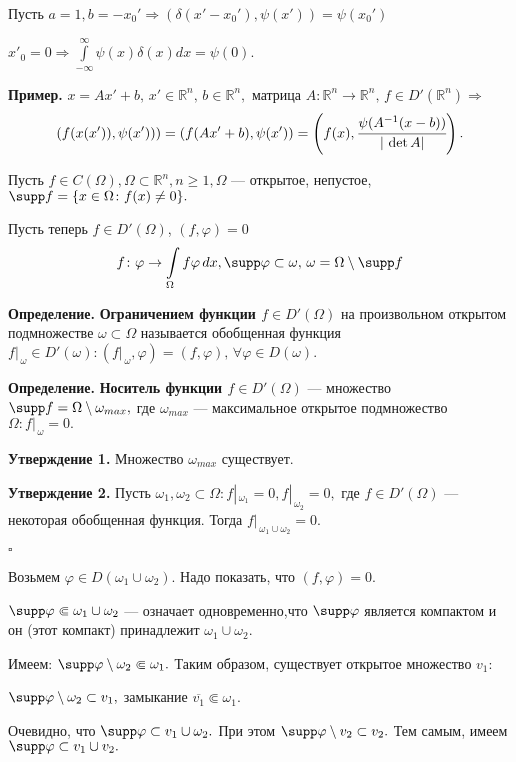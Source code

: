 \documentclass[12pt,a4paper,draft]{article}
\DeclareRobustCommand*{\т}{~--- }
\DeclareRobustCommand*{\ч}{~-- }
\begin{document}
Пусть $a=1, b=-x_0' \Rightarrow
(\delta(x'-x_0'),\psi(x'))=\psi(x_0')$

$x'_0=0 \Rightarrow
\int\limits_{-\infty}^{\infty}\psi(x)\delta(x)dx=\psi(0).$

\textbf{Пример.} $x=Ax'+b,\,x'\in \mathbb R^n, \,b\in\mathbb R^n,
$ матрица $A\colon \mathbb R^n\to\mathbb R^n, \,f\in D'(\mathbb
R^n) \Rightarrow $
$$(f(x(x')),\psi(x')))=(f(Ax'+b),\psi(x'))=\left(f(x),\cfrac{\psi(A^{-1}(x-b))}{|\,\det
A|}\right).$$


Пусть $f\in C(\Omega), \Omega\subset \mathbb R^n, n\ge1, \Omega$
--- открытое, непустое, $\supp f=\{x\in \Omega\colon f(x)\ne0\}.$

Пусть теперь $f\in D'(\Omega)$, $(f,\varphi)=0$
$$f\colon \varphi\to\int\limits_{\Omega}f\varphi\,dx, \supp \varphi\subset \omega,\, \omega=\Omega \setminus \supp f$$

\textbf{Определение.} \textbf{Ограничением функции $f\in D'
(\Omega)$} на произвольном открытом подмножестве
$\omega\subset\Omega$ называется обобщенная функция
$f|_{\,\omega}\in D' (\omega)\colon
(f|_{\,\omega},\varphi)=(f,\varphi), \,\forall \varphi \in D
(\omega).$

\textbf{Определение.} \textbf{Носитель функции $f\in D' (\Omega)$}
--- множество $\supp f=\Omega \setminus \omega_{max},$ где
$\omega_{max}$ --- максимальное открытое подмножество
$\Omega\colon f|_{\,\omega}=0.$

\textbf{Утверждение 1.} Множество $\omega_{max}$ существует.

\textbf{Утверждение 2.} Пусть $\omega_1, \omega_2\subset
\Omega\colon f|_{\,\omega_1}=0, f|_{\,\omega_2}=0,$ где $f\in
D'(\Omega)$ --- некоторая обобщенная функция. Тогда
$f|_{\,\omega_1\cup\omega_2}=0.$

$\square$

Возьмем $\varphi\in D(\omega_1\cup\omega_2).$ Надо показать, что
$(f,\varphi)=0.$

$\supp \varphi\Subset \omega_1\cup\omega_2$ --- означает
одновременно,что $\supp \varphi$ является компактом и он (этот
компакт) принадлежит $\omega_1\cup\omega_2.$

Имеем: $\supp \varphi \setminus \omega_2 \Subset \omega_1.$ Таким
образом, существует открытое множество $v_1:$

$\supp \varphi \setminus \omega_2 \subset v_1,$ замыкание
$\overline {v_1}\Subset \omega_1.$

Очевидно, что $\supp \varphi \subset v_1\cup\omega_2.$ При этом
$\supp \varphi \setminus v_2\subset v_2.$ Тем самым, имеем $\supp
\varphi\subset v_1\cup v_2.$
\end{document}
